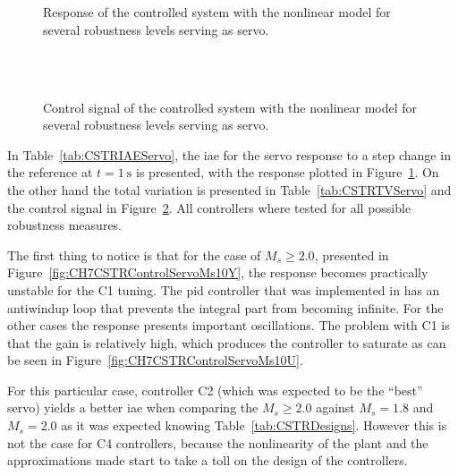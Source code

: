 %
\begin{figure}
	\centering
	\\
	\\
	\caption{Response of the controlled system with the nonlinear model for several robustness levels serving as servo.}
	\label{fig:CH7CSTRControlServoY}
\end{figure}
%
%
\begin{figure}
	\centering
	\\
	\\
	\caption{Control signal of the controlled system with the nonlinear model for several robustness levels serving as servo.}
	\label{fig:CH7CSTRControlServoU}
\end{figure}
%
In Table~\ref{tab:CSTRIAEServo}, the \gls{iae} for the servo response to a step change in the reference at $t= \SI{1}{\second}$ is presented, with the response  plotted in Figure~\ref{fig:CH7CSTRControlServoY}. On the other hand the total variation is presented in Table~\ref{tab:CSTRTVServo} and the control signal in Figure~\ref{fig:CH7CSTRControlServoU}. All controllers where tested for all possible robustness measures.

The first thing to notice is that for the case of $M_s \geq 2.0$, presented in Figure~\ref{fig:CH7CSTRControlServoMs10Y}, the response becomes practically unstable for the C1 tuning. The \gls{pid} controller that was implemented in \simulink{} has an antiwindup loop that prevents the integral part from becoming infinite. For the other cases the response presents important oscillations. The problem with C1 is that the gain is relatively high, which produces the controller to saturate as can be seen in Figure~\ref{fig:CH7CSTRControlServoMs10U}.

For this particular case, controller C2 (which was expected to be the ``best'' servo) yields a better \gls{iae} when comparing the $M_s \geq 2.0$ against $M_s = 1.8$ and $M_s = 2.0$ as it was expected knowing Table~\ref{tab:CSTRDesigns}. However this is not the case for C4 controllers, because the nonlinearity of the plant and the approximations made start to take a toll on the design of the controllers.

